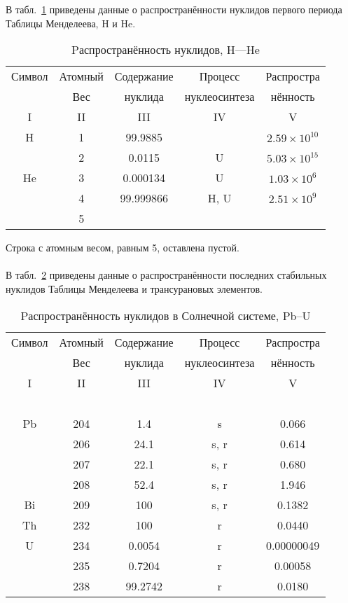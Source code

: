 \documentclass[a5paper,openany]{book}
\begin{document}
В табл.~\ref{t:AbudanceI} приведены данные о распространённости нуклидов первого периода Таблицы Менделеева, H и He.

\begin{table}[h!]
	{\footnotesize 
		\begin{tabular}{ccccc}
			Символ  & Атомный &  Содержание  & Процесс & Распростра   \\
			~ & Вес &  нуклида  &  нуклеосинтеза  & нённость  \\
			\hline 
			I & II &  III  & IV & V \\
			\hline 
			H & 1 & 99.9885 &  &  $2.59 \times 10^{10}$\\ [1mm]
			& 2 & 0.0115 & U & $5.03 \times 10^{15}$\\ [1mm]
			He & 3 & 0.000134 & U &  $1.03 \times 10^{6}$\\ [1mm]
			& 4 & 99.999866 & H, U & $2.51 \times 10^{9}$\\ [1mm]
			& 5 & &  & \\ [1mm]
			\hline 
		\end{tabular}
	}
	\caption{Pаспространённость нуклидов, H---He}
	\label{t:AbudanceI}
\end{table} 

Строка с атомным весом, равным 5, оставлена пустой.
~\\
~\\

В табл.~\ref{t:AbudancePb-U} приведены данные о распространённости последних стабильных нуклидов Таблицы Менделеева и трансурановых элементов.

\begin{table}[h!]
	{\footnotesize 
		\begin{tabular}{ccccc}
			Символ  & Атомный &  Содержание  & Процесс & Распростра   \\
			~ & Вес &  нуклида  &  нуклеосинтеза  & нённость  \\
			\hline 
			I & II &  III  & IV & V \\
			\hline 
			~ & ~ & ~ & ~ & ~  \\
			Pb & 204 & 1.4 & s &  0.066 \\ [1mm]
			& 206 & 24.1 & s, r & 0.614 \\ [1mm] 			
			& 207 & 22.1 & s, r & 0.680 \\ [1mm] 				
			& 208 & 52.4 & s, r & 1.946 \\ [1mm] 	
			Bi & 209 & 100 &  s, r &  0.1382 \\ [1mm]
			\hline
			Th & 232 & 100 &  r &  0.0440 \\ [1mm]	
			U & 234 & 0.0054 &  r &  0.00000049 \\ [1mm]
			& 235 & 0.7204 &  r &  0.00058 \\ [1mm]	
			& 238 & 99.2742 &  r &  0.0180  \\ [1mm]		
			\hline 
		\end{tabular}
	}
	\caption{Pаспространённость нуклидов в Солнечной системе, Pb--U}
	\label{t:AbudancePb-U}
\end{table}
\end{document}

